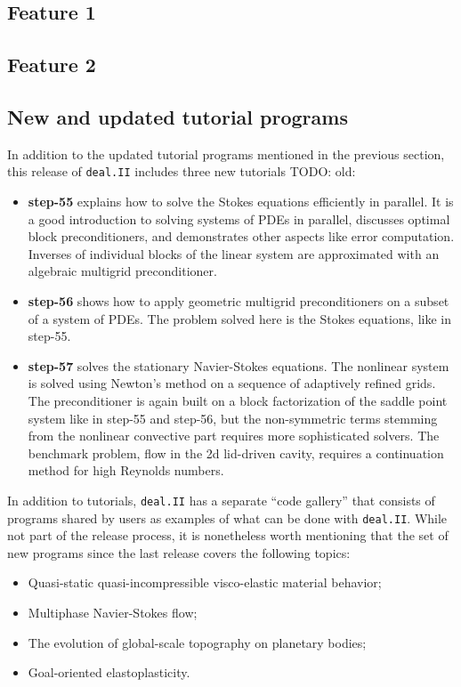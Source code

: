 \documentclass{ansarticle-preprint}
\newcommand{\specialword}[1]{\texttt{#1}}
\newcommand{\dealii}{{\specialword{deal.II}}}
\begin{document}
\subsection{Feature 1}

\subsection{Feature 2}


\subsection{New and updated tutorial programs}
In addition to the updated tutorial programs mentioned in the previous
section, this release of \dealii{} includes three new tutorials TODO: old:
\begin{itemize}
 \item {\bf step-55} explains how to solve the Stokes
 equations efficiently in parallel. It is a good introduction to solving
 systems of PDEs in parallel, discusses optimal block
 preconditioners, and demonstrates other aspects like error computation.
 Inverses of individual blocks of the linear system are approximated with an algebraic
 multigrid preconditioner.

 \item {\bf step-56} shows how to apply geometric multigrid
 preconditioners on a subset of a system of PDEs. The problem solved here is the
 Stokes equations, like in step-55.

 \item {\bf step-57} solves the stationary Navier-Stokes equations.
 The nonlinear system is solved using Newton's method on a sequence of adaptively refined
 grids. The preconditioner is again built on a block factorization of the saddle point
 system like in step-55 and step-56, but the non-symmetric terms stemming from the
 nonlinear convective part requires more sophisticated solvers. The benchmark problem,
 flow in the 2d lid-driven cavity, requires a continuation method for high Reynolds
 numbers.
 \end{itemize}

In addition to tutorials, \dealii{} has a separate ``code gallery'' that
consists of programs shared by users as examples of what can be
done with \dealii{}. While not part of the release process, it is nonetheless
worth mentioning that the set of new programs since the last release covers
the following topics:
  \begin{itemize}
    \item Quasi-static quasi-incompressible visco-elastic material behavior;
    \item Multiphase Navier-Stokes flow;
    \item The evolution of global-scale topography on planetary bodies;
    \item Goal-oriented elastoplasticity.
  \end{itemize}
\end{document}
